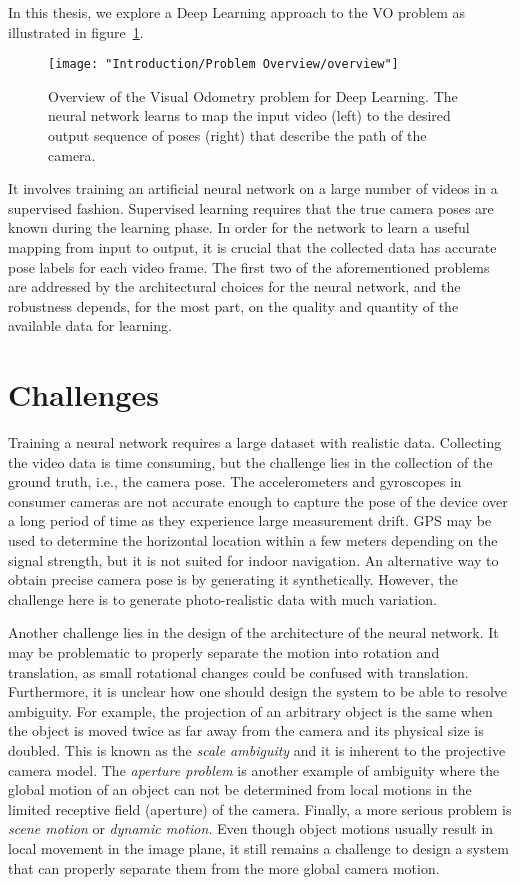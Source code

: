 		In this thesis, we explore a Deep Learning approach to the VO problem as illustrated in figure~\ref{fig:overview-visual-odometry}.
		\begin{figure}[t]
			\centering
			\texttt{[image: "Introduction/Problem Overview/overview"]}
			\caption[Description of the Visual Odometry problem]
					{Overview of the Visual Odometry problem for Deep Learning.
					 The neural network learns to map the input video (left) to the desired output sequence of poses (right) that describe the path of the camera.
					 \label{fig:overview-visual-odometry}}
		\end{figure}
		It involves training an artificial neural network on a large number of videos in a supervised fashion.
		Supervised learning requires that the true camera poses are known during the learning phase.
		In order for the network to learn a useful mapping from input to output, it is crucial that the collected data has accurate pose labels for each video frame.
		The first two of the aforementioned problems are addressed by the architectural choices for the neural network, and the robustness depends, for the most part, on the quality and quantity of the available data for learning.
		
	\section{Challenges}
		
		Training a neural network requires a large dataset with realistic data.
		Collecting the video data is time consuming, but the challenge lies in the collection of the ground truth, i.e., the camera pose.
		The accelerometers and gyroscopes in consumer cameras are not accurate enough to capture the pose of the device over a long period of time as they experience large measurement drift.
		GPS may be used to determine the horizontal location within a few meters depending on the signal strength, but it is not suited for indoor navigation.
		An alternative way to obtain precise camera pose is by generating it synthetically.
		However, the challenge here is to generate photo-realistic data with much variation.
		
		Another challenge lies in the design of the architecture of the neural network.
		It may be problematic to properly separate the motion into rotation and translation, as small rotational changes could be confused with translation.
		Furthermore, it is unclear how one should design the system to be able to resolve ambiguity.
		For example, the projection of an arbitrary object is the same when the object is moved twice as far away from the camera and its physical size is doubled.
		This is known as the \emph{scale ambiguity} and it is inherent to the projective camera model.
		The \emph{aperture problem} is another example of ambiguity where the global motion of an object can not be determined from local motions in the limited receptive field (aperture) of the camera.
		Finally, a more serious problem is \emph{scene motion} or \emph{dynamic motion}.
		Even though object motions usually result in local movement in the image plane, it still remains a challenge to design a system that can properly separate them from the more global camera motion.
		
